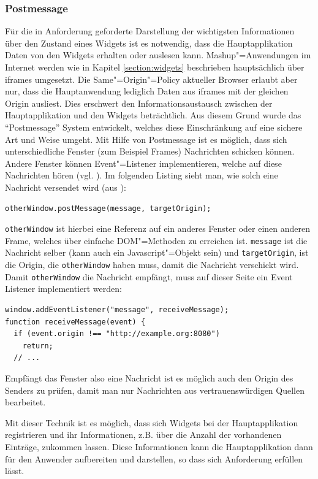 \subsubsection*{Postmessage}
Für die in Anforderung  geforderte Darstellung der wichtigsten Informationen über den Zustand eines Widgets ist es notwendig, dass die Hauptapplikation Daten von den Widgets erhalten oder auslesen kann. Mashup"=Anwendungen im Internet werden wie in Kapitel \ref{section:widgets} beschrieben hauptsächlich über iframes umgesetzt. Die Same"=Origin"=Policy aktueller Browser erlaubt aber nur, dass die Hauptanwendung lediglich Daten aus iframes mit der gleichen Origin ausliest. Dies erschwert den Informationsaustausch zwischen der Hauptapplikation und den Widgets beträchtlich. Aus diesem Grund wurde das "`Postmessage"' System entwickelt, welches diese Einschränkung auf eine sichere Art und Weise umgeht. Mit Hilfe von Postmessage ist es möglich, dass sich unterschiedliche Fenster (zum Beispiel Frames) Nachrichten schicken können. Andere Fenster können Event"=Listener implementieren, welche auf diese Nachrichten hören (vgl. \cite{MDN2012}). Im folgenden Listing sieht man, wie solch eine Nachricht versendet wird (aus \cite{MDN2012}):
\begin{lstlisting}
otherWindow.postMessage(message, targetOrigin);
\end{lstlisting}
\texttt{otherWindow} ist hierbei eine Referenz auf ein anderes Fenster oder einen anderen Frame, welches über einfache \ac{DOM}"=Methoden zu erreichen ist. \texttt{message} ist die Nachricht selber (kann auch ein Javascript"=Objekt sein) und \texttt{targetOrigin}, ist die Origin, die \texttt{otherWindow} haben muss, damit die Nachricht verschickt wird. Damit \texttt{otherWindow} die Nachricht empfängt, muss auf dieser Seite ein Event Listener implementiert werden:
\begin{lstlisting}
window.addEventListener("message", receiveMessage);
function receiveMessage(event) {
  if (event.origin !== "http://example.org:8080")
    return;
  // ...
\end{lstlisting}
Empfängt das Fenster also eine Nachricht ist es möglich auch den Origin des Senders zu prüfen, damit man nur Nachrichten aus vertrauenswürdigen Quellen bearbeitet.

Mit dieser Technik ist es möglich, dass sich Widgets bei der Hauptapplikation registrieren und ihr Informationen, z.B. über die Anzahl der vorhandenen Einträge, zukommen lassen. Diese Informationen kann die Hauptapplikation dann für den Anwender aufbereiten und darstellen, so dass sich Anforderung  erfüllen lässt.

